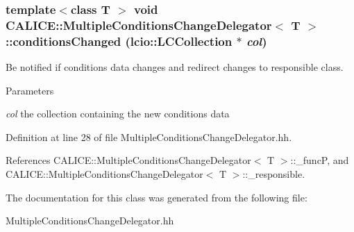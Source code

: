 \subsubsection[{conditionsChanged}]{\setlength{\rightskip}{0pt plus 5cm}template$<$class T $>$ void {\bf CALICE::MultipleConditionsChangeDelegator}$<$ T $>$::conditionsChanged (lcio::LCCollection $\ast$ {\em col})\hspace{0.3cm}{\ttfamily  [inline]}}\label{classCALICE_1_1MultipleConditionsChangeDelegator_a90d8bb55cc290174c0d5ae842af37225}


Be notified if conditions data changes and redirect changes to responsible class. 
\begin{DoxyParams}{Parameters}
\item[{\em col}]the collection containing the new conditions data \end{DoxyParams}


Definition at line 28 of file MultipleConditionsChangeDelegator.hh.

References CALICE::MultipleConditionsChangeDelegator$<$ T $>$::\_\-funcP, and CALICE::MultipleConditionsChangeDelegator$<$ T $>$::\_\-responsible.

The documentation for this class was generated from the following file:\begin{DoxyCompactItemize}
\item 
MultipleConditionsChangeDelegator.hh\end{DoxyCompactItemize}
